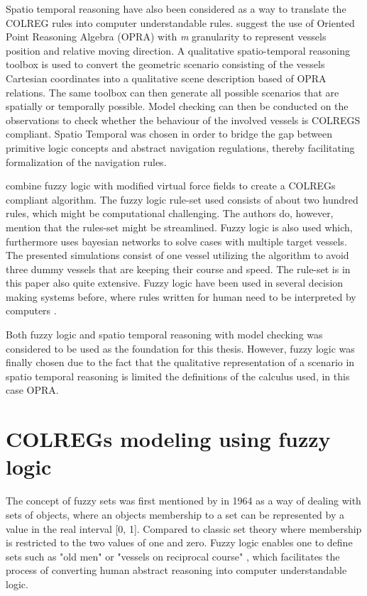 Spatio temporal reasoning have also been considered as a way to translate the COLREG rules into computer understandable rules. \textcite{spat_temp1,spat_temp2}
suggest the use of Oriented Point Reasoning Algebra (OPRA) with \textit{m}  granularity to represent vessels position and relative moving direction.
A qualitative spatio-temporal reasoning toolbox is used to convert the geometric scenario consisting of the vessels Cartesian coordinates into a qualitative scene description based of OPRA relations. The same toolbox can then generate all possible scenarios that are spatially or temporally possible. Model checking can then be conducted on the  observations to check whether the behaviour of the involved vessels is  COLREGS compliant. Spatio Temporal was chosen in order to bridge the gap between primitive logic concepts and abstract navigation regulations, thereby facilitating formalization of the navigation rules.


\textcite{lee2004fuzzy} combine fuzzy logic with modified virtual force fields to  create a COLREGs compliant algorithm. The fuzzy logic rule-set used consists of about two hundred rules, which might be computational challenging. The authors do, however, mention that the rules-set might be streamlined. Fuzzy logic is also used \textcite{perera2012intelligent} which, furthermore uses bayesian networks to solve cases with multiple target vessels. The presented simulations consist of one vessel utilizing the algorithm to avoid three dummy vessels that are keeping their course and speed. The rule-set is in this paper also quite extensive. Fuzzy logic have been used in several decision making systems before, where rules written for human need to be interpreted by computers \cite{perera2012intelligent}.


Both fuzzy logic and spatio temporal reasoning with model checking was considered to be used as the foundation for this thesis. However, fuzzy logic was finally chosen due to the fact that the qualitative representation of a scenario in spatio temporal reasoning is limited the definitions of the calculus used, in this case OPRA.
\chapter{COLREGs modeling using fuzzy logic}

The concept of fuzzy sets was first mentioned by \textcite{zadeh1996fuzzy} in 1964 as a way of dealing with sets of objects, where an objects membership to a set can be represented by a value in the real interval [0, 1]. Compared to classic set theory where  membership is restricted to the two values of one and zero. Fuzzy logic enables one to define sets such as "old men" or "vessels on reciprocal course" \cite{zadeh1996fuzzy}, which facilitates the process of converting human abstract reasoning into computer understandable logic.

